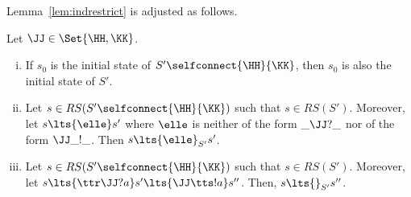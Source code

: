  Lemma~\ref{lem:indrestrict} is adjusted as follows.
 
 
 \begin{lemma}
\label{lem:indrestrictself}
Let $\JJ\in\Set{\HH,\KK}$.
\begin{enumerate}[i)]
\item
If ${s_0}$ is the initial state of $S'\selfconnect{\HH}{\KK}$, then $s_0$ is also the initial state of $S'$. 
\item
Let $s\in RS(S'\selfconnect{\HH}{\KK})$ such that $s\in RS(S')$.
Moreover, let $s\lts{\elle}s'$  where $\elle$ is neither of the form $\_\JJ?\_$ nor of the form $\JJ\_!\_$.
Then  $s\lts{\elle}_{S'} s'$.
\item
Let $s\in RS(S'\selfconnect{\HH}{\KK})$ such that $s\in RS(S')$.
Moreover, let  $s\lts{\ttr\JJ?a} s'\lts{\JJ\tts!a} s''$. %
Then, $s\lts{}_{S'} s''$.
\end{enumerate}
\end{lemma}

